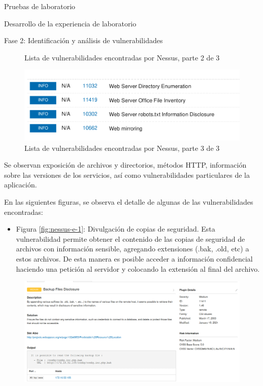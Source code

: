 \begin{section}{Pruebas de laboratorio}
\begin{subsection}{Desarrollo de la experiencia de laboratorio}
\begin{subsubsection} {Fase 2: Identificación y análisis de vulnerabilidades}
\begin{figure}[H]
    \caption{Lista de vulnerabilidades encontradas por Nessus, parte 2 de 3}
    \label{fig:nessus-2}
    \end{figure}
    \FloatBarrier 
     \begin{figure}[H]
    \centering
    \includegraphics[width=1\textwidth]{./iteracion_3_imagenes/nessus-3.png}
    \caption{Lista de vulnerabilidades encontradas por Nessus, parte 3 de 3}
    \label{fig:nessus-3}
    \end{figure}
    \FloatBarrier 
    Se observan  exposición de archivos y directorios, métodos HTTP, información sobre las versiones de los servicios, así como vulnerabilidades particulares de la aplicación.\par
    En las siguientes figuras, se observa el detalle de algunas de las vulnerabilidades encontradas:
    \begin{itemize}
        \item Figura \ref{fig:nessus-e-1}: Divulgación de copias de seguridad. Esta vulnerabilidad permite obtener el contenido de las copias de seguridad de archivos con información sensible, agregando extensiones (.bak, .old, etc) a estos archivos. De esta manera es posible acceder a información confidencial haciendo una petición al servidor y colocando la extensión al final del archivo.
    \end{itemize}
    \begin{figure}[H]
    \centering
    \includegraphics[width=1\textwidth]{./iteracion_3_imagenes/nessus-e-1.png}

\end{figure}
\end{subsubsection}
\end{subsection}
\end{section}
